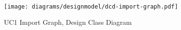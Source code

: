 \begin{figure}[p]%
\end{figure}
\begin{figure}[H]
    \centering
    \texttt{[image: diagrams/designmodel/dcd-import-graph.pdf]}
    \caption{UC1 Import Graph, Design Class Diagram}
    \label{fig:import-graph-dcd}
\end{figure}
% 
